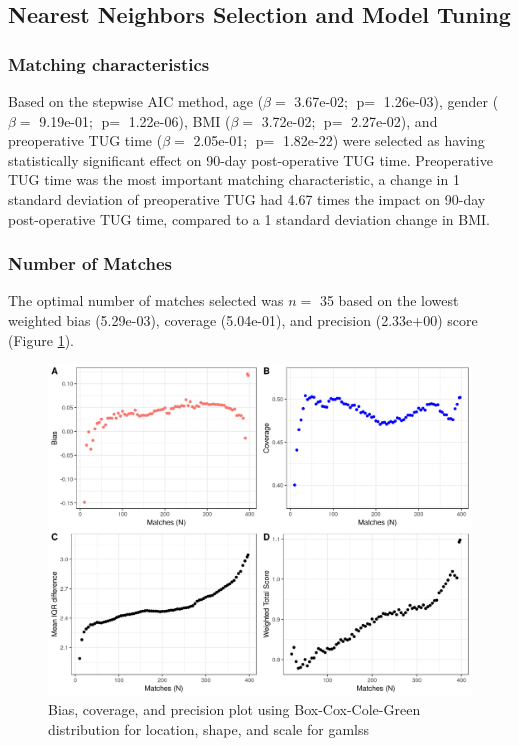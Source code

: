 \documentclass[fleqn,10pt]{wlscirep}\usepackage{knitr}
\begin{document}
\subsection*{Nearest Neighbors Selection and Model Tuning}




\subsubsection*{Matching characteristics}

Based on the stepwise AIC method, age ($\beta = $ 3.67e-02; $\text{p} = $ 1.26e-03), gender ($\beta = $ 9.19e-01; $\text{p} = $ 1.22e-06), BMI ($\beta = $ 3.72e-02; $\text{p} = $ 2.27e-02), and preoperative TUG time ($\beta = $ 2.05e-01; $\text{p} = $ 1.82e-22) were selected as having statistically significant effect on 90-day post-operative TUG time. Preoperative TUG time was the most important matching characteristic, a change in 1 standard deviation of preoperative TUG had 4.67 times the impact on 90-day post-operative TUG time, compared to a 1 standard deviation change in BMI.

\subsubsection*{Number of Matches}



The optimal number of matches selected was $n = $ 35 based on the lowest weighted bias (5.29e-03), coverage (5.04e-01), and precision (2.33e+00) score (Figure \ref{fig:fig_BCCGo_loocv}). 

\begin{figure}[!htbp]
\centering
\includegraphics[width=\linewidth]{fig_BCCGo_loocv}
\caption{Bias, coverage, and precision plot using Box-Cox-Cole-Green distribution for location, shape, and scale for gamlss}
\label{fig:fig_BCCGo_loocv}
\end{figure}
\end{document}
